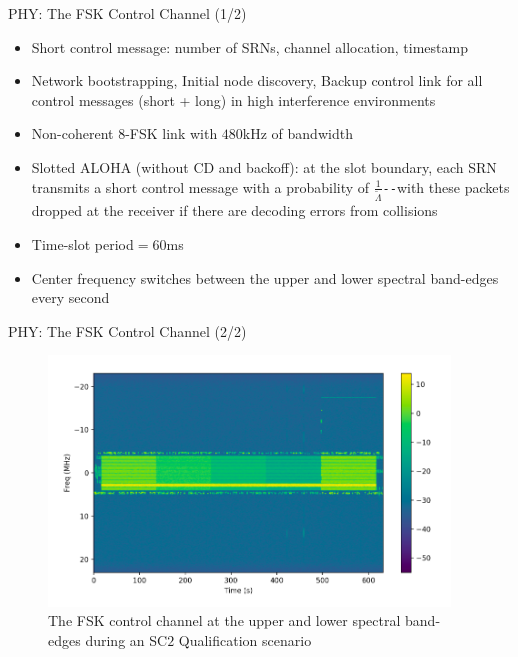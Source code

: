 \documentclass{beamer}
\begin{document}
\begin{frame}{PHY: The FSK Control Channel (1/2)}
    \begin{itemize}
        \item Short control message: number of SRNs, channel allocation, timestamp
        \item Network bootstrapping, Initial node discovery, Backup control link for all control messages (short + long) in high interference environments
        \item Non-coherent $8$-FSK link with $480$kHz of bandwidth
        \item Slotted ALOHA (without CD and backoff): at the slot boundary, each SRN transmits a short control message with a probability of $\frac{1}{\tilde{\Lambda}}$\texttt{-{}-}with these packets dropped at the receiver if there are decoding errors from collisions
        \item Time-slot period${=}60$ms
        \item Center frequency switches between the upper and lower spectral band-edges every second
    \end{itemize}
\end{frame}
\begin{frame}{PHY: The FSK Control Channel (2/2)}
\begin{figure}
    \centering
    \includegraphics[width = 0.95\textwidth]{Control_Channels_At_Band_Edges.PNG}
    \caption{The FSK control channel at the upper and lower spectral band-edges during an SC$2$ Qualification scenario}
    \label{fig:5}
\end{figure}
\end{frame}
\end{document}
